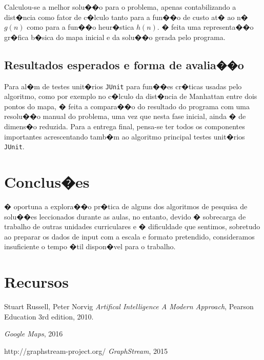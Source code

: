 \documentclass[a4paper,11pt]{article}
\begin{document}
Calculou-se a melhor solu��o para o problema, apenas contabilizando a dist�ncia como fator de c�lculo tanto para a fun��o de custo at� ao n� $g(n)$ como para a fun��o heur�stica $h(n)$. � feita uma representa��o gr�fica b�sica do mapa inicial e da solu��o gerada pelo programa.

\subsection{Resultados esperados e forma de avalia��o}

Para al�m de testes unit�rios \texttt{JUnit} para fun��es cr�ticas usadas pelo algoritmo, como por exemplo no c�lculo da dist�ncia de Manhattan entre dois pontos do mapa, � feita a compara��o do resultado do programa com uma resolu��o manual do problema, uma vez que nesta fase inicial, ainda � de dimens�o reduzida. Para a entrega final, pensa-se ter todos os componentes importantes acrescentando tamb�m ao algoritmo principal testes unit�rios \texttt{JUnit}.

\section{Conclus�es}

� oportuna a explora��o pr�tica de alguns dos algoritmos de pesquisa de solu��es leccionados durante as aulas, no entanto, devido � sobrecarga de trabalho de outras unidades curriculares e � dificuldade que sentimos, sobretudo ao preparar os dados de input com a escala e formato pretendido, consideramos insuficiente o tempo �til dispon�vel para o trabalho.

\section{Recursos}

\begin{thebibliography}{9}

  Stuart Russell, Peter Norvig
  \emph{Artifical Intelligence A Modern Approach},
  Pearson Education
  3rd edition,
  2010.

  \emph{Google Maps},
  2016

  http://graphstream-project.org/
  \emph{GraphStream},
  2015

\end{thebibliography}
\end{document}
